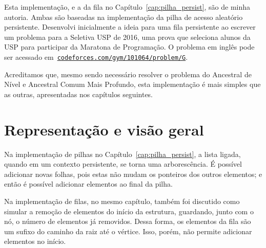 \documentclass[main.tex]{subfiles}
\begin{document}
Esta implementação, e a da fila no Capítulo~\ref{cap:pilha_persist}, são de minha autoria. Ambas são baseadas na implementação da pilha de acesso aleatório persistente. Desenvolvi inicialmente a ideia para uma fila persistente ao escrever um problema para a Seletiva USP de 2016, uma prova que seleciona alunos da USP para participar da Maratona de Programação. O problema em inglês pode ser acessado em~\href{http://codeforces.com/gym/101064/problem/G}{\texttt{codeforces.com/gym/101064/problem/G}}.

Acreditamos que, mesmo sendo necessário resolver o problema do Ancestral de Nível e Ancestral Comum Mais Profundo, esta implementação é mais simples que as outras, apresentadas nos capítulos seguintes.

\section{Representação e visão geral}

Na implementação de pilhas no Capítulo~\ref{cap:pilha_persist}, a lista ligada, quando em um contexto persistente, se torna uma arborescência. É possível adicionar novas folhas, pois estas não mudam os ponteiros dos outros elementos; e então é possível adicionar elementos ao final da pilha.

Na implementação de filas, no mesmo capítulo, também foi discutido como simular a remoção de elementos do início da estrutura, guardando, junto com o nó, o número de elementos já removidos. Dessa forma, os elementos da fila são um sufixo do caminho da raiz até o vértice. Isso, porém, não permite adicionar elementos no início.
\end{document}
